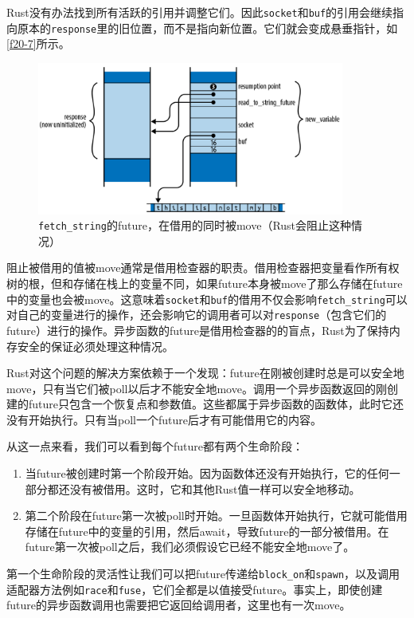 Rust没有办法找到所有活跃的引用并调整它们。因此\texttt{socket}和\texttt{buf}的引用会继续指向原本的\texttt{response}里的旧位置，而不是指向新位置。它们就会变成悬垂指针，如\autoref{f20-7}所示。

\begin{figure}
    \centering
    \includegraphics[width=0.9\textwidth]{../img/f20-7.png}
    \caption{\texttt{fetch\_string}的future，在借用的同时被move（Rust会阻止这种情况）}
    \label{f20-7}
\end{figure}

阻止被借用的值被move通常是借用检查器的职责。借用检查器把变量看作所有权树的根，但和存储在栈上的变量不同，如果future本身被move了那么存储在future中的变量也会被move。这意味着\texttt{socket}和\texttt{buf}的借用不仅会影响\texttt{fetch\_string}可以对自己的变量进行的操作，还会影响它的调用者可以对\texttt{response}（包含它们的future）进行的操作。异步函数的future是借用检查器的的盲点，Rust为了保持内存安全的保证必须处理这种情况。

Rust对这个问题的解决方案依赖于一个发现：future在刚被创建时总是可以安全地move，只有当它们被poll以后才不能安全地move。调用一个异步函数返回的刚创建的future只包含一个恢复点和参数值。这些都属于异步函数的函数体，此时它还没有开始执行。只有当poll一个future后才有可能借用它的内容。

从这一点来看，我们可以看到每个future都有两个生命阶段：
\begin{enumerate}
    \item 当future被创建时第一个阶段开始。因为函数体还没有开始执行，它的任何一部分都还没有被借用。这时，它和其他Rust值一样可以安全地移动。
    \item 第二个阶段在future第一次被poll时开始。一旦函数体开始执行，它就可能借用存储在future中的变量的引用，然后await，导致future的一部分被借用。在future第一次被poll之后，我们必须假设它已经不能安全地move了。
\end{enumerate}

第一个生命阶段的灵活性让我们可以把future传递给\texttt{block\_on}和\texttt{spawn}，以及调用适配器方法例如\texttt{race}和\texttt{fuse}，它们全都是以值接受future。事实上，即使创建future的异步函数调用也需要把它返回给调用者，这里也有一次move。


